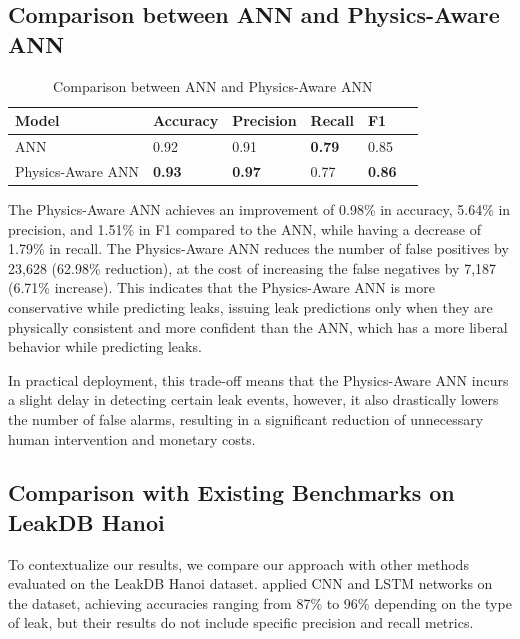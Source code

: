 \documentclass[final,5p,times,twocolumn,authoryear]{elsarticle}
\begin{document}
\subsection{Comparison between ANN and Physics-Aware ANN}

\begin{table}[H]
\centering
\caption{Comparison between ANN and Physics-Aware ANN}
\label{tab:ann_paann_comparison}
\begin{tabular}{@{}llllll@{}}
\toprule
\textbf{Model}             & \textbf{Accuracy} & \textbf{Precision} & \textbf{Recall} & \textbf{F1}     \\ \midrule
ANN               & 0.92   & 0.91    & \textbf{0.79} & 0.85 \\
Physics-Aware ANN & \textbf{0.93}   & \textbf{0.97}    & 0.77 & \textbf{0.86}  \\ \bottomrule
\end{tabular}
\end{table}

The Physics-Aware ANN achieves an improvement of 0.98\% in accuracy, 5.64\% in precision, and 1.51\% in F1 compared to the ANN, while having a decrease of 1.79\% in recall. The Physics-Aware ANN reduces the number of false positives by 23,628 (62.98\% reduction), at the cost of increasing the false negatives by 7,187 (6.71\% increase). This indicates that the Physics-Aware ANN is more conservative while predicting leaks, issuing leak predictions only when they are physically consistent and more confident than the ANN, which has a more liberal behavior while predicting leaks.

In practical deployment, this trade-off means that the Physics-Aware ANN incurs a slight delay in detecting certain leak events, however, it also drastically lowers the number of false alarms, resulting in a significant reduction of unnecessary human intervention and monetary costs.

\subsection{Comparison with Existing Benchmarks on \textbf{LeakDB} \textbf{Hanoi}}

To contextualize our results, we compare our approach with other methods evaluated on the LeakDB Hanoi dataset. \cite{punukollu2023leakdetection} applied CNN and LSTM networks on the dataset, achieving accuracies ranging from 87\% to 96\% depending on the type of leak, but their results do not include specific precision and recall metrics.
\end{document}
